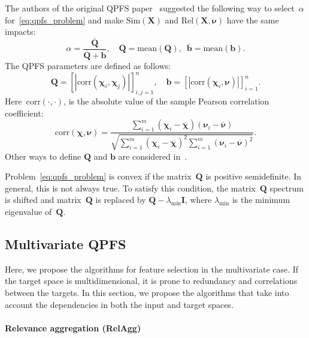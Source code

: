 \documentclass[preprint,12pt]{elsarticle}
\theoremstyle{definition}
\newcommand{\bb}{\mathbf{b}}
\newcommand{\bX}{\mathbf{X}}
\newcommand{\bQ}{\mathbf{Q}}
\newcommand{\bchi}{\boldsymbol{\chi}}
\newcommand{\bnu}{\boldsymbol{\nu}}
\begin{document}
The authors of the original QPFS paper~\cite{rodriguez2010quadratic} suggested the following way to select~$\alpha$ for~\eqref{eq:qpfs_problem} and make $\text{Sim}(\bX)$ and $\text{Rel}(\bX, \bnu)$ have the same impacts:
\begin{equation*}
\alpha = \frac{\overline{\bQ}}{\overline{\bQ} + \overline{\bb}}, \quad \overline{\bQ} = \text{mean} (\bQ), \,\,\, \overline{\bb}= \text{mean} (\bb).
\end{equation*}
The QPFS parameters are defined as follows:
\begin{equation}
\bQ = \left[|\text{corr}(\bchi_i, \bchi_j)|\right]_{i,j=1}^n, \quad \bb = \left[|\text{corr}(\bchi_i, \bnu)|\right]_{i=1}^n.
\label{eq:qpfs_1d_qb}
\end{equation}
Here~$\text{corr}(\cdot, \cdot)$, is the absolute value of the sample Pearson correlation coefficient:
\begin{equation*}
\text{corr}(\bchi, \bnu) = \frac{\sum_{i=1}^m(\bchi_i - \overline{\bchi})( \bnu_i - \overline{\bnu})}{\sqrt{\sum_{i=1}^m(\bchi_i - \overline{\bchi})^2\sum_{i=1}^m(\bnu_i - \overline{\bnu})^2}}.
\end{equation*}
Other ways to define $\bQ$ and $\bb$ are considered in~\cite{katrutsa2017comprehensive}.

Problem~\eqref{eq:qpfs_problem} is convex if the matrix~$\bQ$ is positive semidefinite. In general, this is not always true.
To satisfy this condition, the matrix~$\bQ$ spectrum is shifted and matrix~$\bQ$ is replaced by $\bQ - \lambda_{\text{min}} \mathbf{I}$, where $\lambda_{\text{min}} $ is the minimum eigenvalue of~$\bQ$.

\subsection{Multivariate QPFS}

Here, we propose the algorithms for feature selection in the multivariate case. 
If the target space is multidimensional, it is prone to redundancy and correlations between the targets. 
In this section, we propose the algorithms that take into account the dependencies in both the input and target spaces.

\paragraph{Relevance aggregation (RelAgg)}
\end{document}
